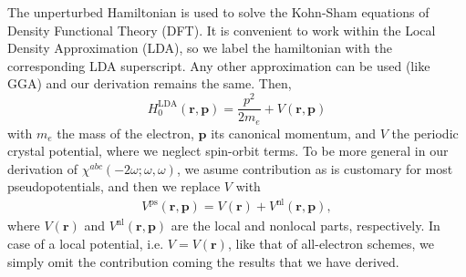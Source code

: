 \documentclass[floatfix,prb,aps,superscriptaddress,showpacs,letterpaper]{revtex4}
\begin{document}
The unperturbed Hamiltonian 
is used to solve the Kohn-Sham equations\cite{kohnPR65} of Density  
Functional Theory (DFT). It is convenient to work within the Local 
Density Approximation (LDA), so we label the hamiltonian with the corresponding  
LDA superscript. Any other approximation can be used (like GGA) and our 
derivation remains the same. Then,
\begin{equation*}
H^{\mathrm{LDA}}_{0}(\mathbf{r},\mathbf{p})
=\frac{p^{2}}{2m_e}+V(\mathbf{r},\mathbf{p})
\end{equation*}
with $m_e$ the mass of the electron, $\mathbf{p}$ its canonical momentum, and 
$V$
 the periodic crystal potential, where we neglect spin-orbit terms.
To be more general in our derivation of
$\chi^{abc}(-2\omega;\omega,\omega)$, we asume
contribution as is customary for most
pseudopotentials, and then we replace $V$ with
\begin{align*}
V^{\mathrm{ps}}(\mathbf{r},\mathbf{p})=V(\mathbf{r})+V^{\mathrm{nl}}(\mathbf{r},\mathbf{p})
,
\end{align*}
where 
$V(\mathbf{r})$ and $V^{\mathrm{nl}}(\mathbf{r},\mathbf{p})$  are the local and nonlocal parts, 
 respectively.
In case of
a local potential, i.e. $V= V(\mathbf{r})$, 
like that of all-electron schemes, 
we simply omit the contribution coming
the results that we have derived.
\end{document}
